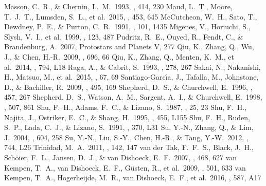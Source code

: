 \documentclass[twocolumn]{aastex61}
\begin{document}
\begin{thebibliography}{}
 Masson, C.~R., \& Chernin, L.~M.\ 1993, \apj, 414, 230 
 Maud, L.~T., Moore, T.~J.~T., Lumsden, S.~L., et al.\ 2015, \mnras, 453, 645
 McCutcheon, W.~H., Sato, T., Dewdney, P.~E., \& Purton, C.~R.\ 1991, \aj, 101, 1435 
 Migenes, V., Horiuchi, S., Slysh, V.~I., et al.\ 1999, \apjs, 123, 487
 Pudritz, R.~E., Ouyed, R., Fendt, C., \& Brandenburg, A.\ 2007, Protostars and Planets V, 277
 Qiu, K., Zhang, Q., Wu, J., \& Chen, H.-R.\ 2009, \apj, 696, 66
 Qiu, K., Zhang, Q., Menten, K.~M., et al.\ 2014, \apjl, 794, L18 
 Raga, A., \& Cabrit, S.\ 1993, \aap, 278, 267 
 Sakai, N., Nakanishi, H., Matsuo, M., et al.\ 2015, \pasj, 67, 69
 Santiago-Garc{\'{\i}}a, J., Tafalla, M., Johnstone, D., \& Bachiller, R.\ 2009, \aap, 495, 169
 Shepherd, D.~S., \& Churchwell, E.\ 1996, \apj, 457, 267
 Shepherd, D.~S., Watson, A.~M., Sargent, A.~I., \& Churchwell, E.\ 1998, \apj, 507, 861 
 Shu, F.~H., Adams, F.~C., \& Lizano, S.\ 1987, \araa, 25, 23 
 Shu, F.~H., Najita, J., Ostriker, E.~C., \& Shang, H.\ 1995, \apjl, 455, L155 
 Shu, F.~H., Ruden, S.~P., Lada, C.~J., \& Lizano, S.\ 1991, \apjl, 370, L31
 Su, Y.-N., Zhang, Q., \& Lim, J.\ 2004, \apj, 604, 258
 Su, Y.-N., Liu, S.-Y., Chen, H.-R., \& Tang, Y.-W.\ 2012, \apjl, 744, L26 
 Trinidad, M.~A.\ 2011, \aj, 142, 147 
 van der Tak, F.~F.~S., Black, J.~H., Sch{\"o}ier, F.~L., Jansen, D.~J., \& van Dishoeck, E.~F.\ 2007, \aap, 468, 627
 van Kempen, T.~A., van Dishoeck, E.~F., G{\"u}sten, R., et al.\ 2009, \aap, 501, 633 
 van Kempen, T.~A., Hogerheijde, M.~R., van Dishoeck, E.~F., et al.\ 2016, \aap, 587, A17

\end{thebibliography}
\end{document}

